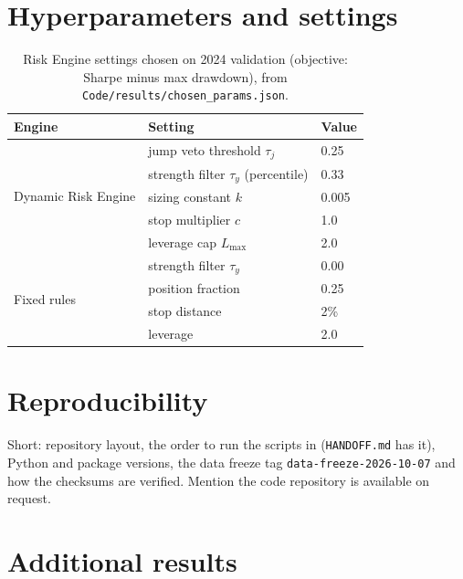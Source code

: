 \chapter{Hyperparameters and settings}\label{app:hyper}

\begin{table}[ht]
  \centering
  \caption{Risk Engine settings chosen on 2024 validation (objective: Sharpe minus max drawdown), from \texttt{Code/results/chosen\_params.json}.}
  \label{tab:chosen}
  \begin{tabular}{lll}
    \toprule
    Engine & Setting & Value \\
    \midrule
    \multirow{5}{*}{Dynamic Risk Engine}
      & jump veto threshold $\tau_j$ & 0.25 \\
      & strength filter $\tau_y$ (percentile) & 0.33 \\
      & sizing constant $k$ & 0.005 \\
      & stop multiplier $c$ & 1.0 \\
      & leverage cap $L_{\max}$ & 2.0 \\
    \midrule
    \multirow{4}{*}{Fixed rules}
      & strength filter $\tau_y$ & 0.00 \\
      & position fraction & 0.25 \\
      & stop distance & 2\% \\
      & leverage & 2.0 \\
    \bottomrule
  \end{tabular}
\end{table}


\chapter{Reproducibility}
\begin{guide}
Short: repository layout, the order to run the scripts in (\texttt{HANDOFF.md} has it), Python and package versions, the data freeze tag \texttt{data-freeze-2026-10-07} and how the checksums are verified. Mention the code repository is available on request.
\end{guide}
\tbc{}

\chapter{Additional results}
